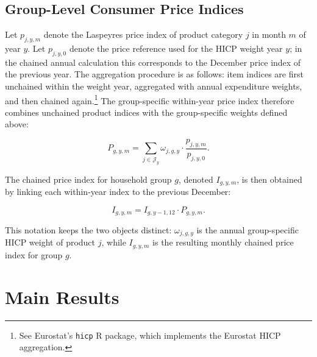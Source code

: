 \documentclass[11pt]{article}
\begin{document}
\subsection*{Group-Level Consumer Price Indices}

Let $p_{j,y,m}$ denote the Laspeyres price index of product category $j$ in month $m$ of year $y$.
Let $p_{j,y,0}$ denote the price reference used for the HICP weight year $y$; in the chained annual
calculation this corresponds to the December price index of the previous year. The aggregation
procedure is as follows: item indices are first unchained within the weight year, aggregated with
annual expenditure weights, and then chained again.\footnote{See Eurostat's \texttt{hicp} R package,
which implements the Eurostat HICP aggregation.} The group-specific within-year price index
therefore combines unchained product indices with the group-specific weights defined above:

\begin{equation}
P_{g,y,m}
=
\sum_{j \in \mathcal{J}_y}
\omega_{j,g,y}
\cdot
\frac{p_{j,y,m}}{p_{j,y,0}}.
\end{equation}

The chained price index for household group $g$, denoted $I_{g,y,m}$, is then obtained by linking
each within-year index to the previous December:

\begin{equation}
I_{g,y,m}
=
I_{g,y-1,12}
\cdot
P_{g,y,m}.
\end{equation}

This notation keeps the two objects distinct: $\omega_{j,g,y}$ is the annual group-specific HICP
weight of product $j$, while $I_{g,y,m}$ is the resulting monthly chained price index for group $g$.






\section{Main Results}
\label{sec:main-results}
\end{document}
